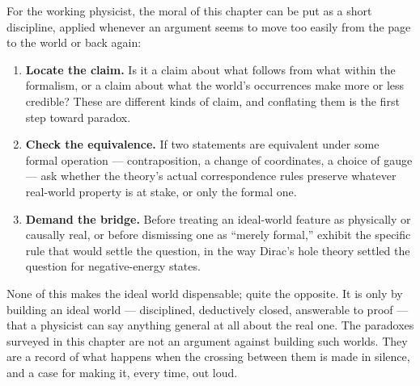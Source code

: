 \documentclass[11pt]{book}
\begin{document}
For the working physicist, the moral of this chapter can be put as a short discipline, applied whenever an argument seems to move too easily from the page to the world or back again:

\begin{enumerate}[label=(\arabic*)]
    \item \textbf{Locate the claim.} Is it a claim about what follows from what within the formalism, or a claim about what the world's occurrences make more or less credible? These are different kinds of claim, and conflating them is the first step toward paradox.
    \item \textbf{Check the equivalence.} If two statements are equivalent under some formal operation --- contraposition, a change of coordinates, a choice of gauge --- ask whether the theory's actual correspondence rules preserve whatever real-world property is at stake, or only the formal one.
    \item \textbf{Demand the bridge.} Before treating an ideal-world feature as physically or causally real, or before dismissing one as ``merely formal,'' exhibit the specific rule that would settle the question, in the way Dirac's hole theory settled the question for negative-energy states.
\end{enumerate}

None of this makes the ideal world dispensable; quite the opposite. It is only by building an ideal world --- disciplined, deductively closed, answerable to proof --- that a physicist can say anything general at all about the real one. The paradoxes surveyed in this chapter are not an argument against building such worlds. They are a record of what happens when the crossing between them is made in silence, and a case for making it, every time, out loud.
\end{document}
